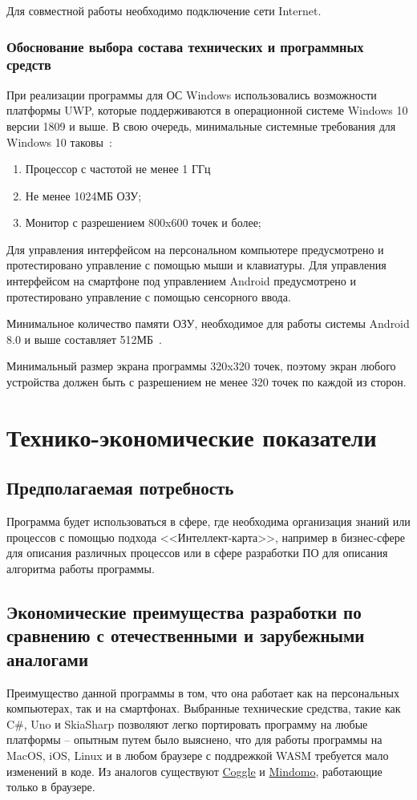 \documentclass[a4paper,12pt]{article}
\begin{document}
    Для совместной работы необходимо подключение сети Internet.

    \subsubsection{Обоснование выбора состава технических и программных средств}
    При реализации программы для ОС Windows использовались возможности платформы UWP, которые поддерживаются в операционной системе Windows 10 версии 1809 и выше. В свою очередь, минимальные системные требования для Windows 10 таковы~\cite{Win10Req}:
    \begin{enumerate}
        \item Процессор с частотой не менее 1 ГГц
        \item Не менее 1024МБ ОЗУ;
        \item Монитор с разрешением 800x600 точек и более;
    \end{enumerate}

    Для управления интерфейсом на персональном компьютере предусмотрено и протестировано управление с помощью мыши и клавиатуры. Для управления интерфейсом на смартфоне под управлением Android предусмотрено и протестировано управление с помощью сенсорного ввода.

    Минимальное количество памяти ОЗУ, необходимое для работы системы Android 8.0 и выше составляет 512МБ~\cite{AndroidReq}.

    Минимальный размер экрана программы 320x320 точек, поэтому экран любого устройства должен быть с разрешением не менее 320 точек по каждой из сторон.

    \newpage


    \section{Технико-экономические показатели}

    \subsection{Предполагаемая потребность}
    Программа будет использоваться в сфере, где необходима организация знаний или процессов с помощью подхода <<Интеллект-карта>>, например в бизнес-сфере для описания различных процессов или в сфере разработки ПО для описания алгоритма работы программы.

    \subsection{Экономические преимущества разработки по сравнению с отечественными и зарубежными аналогами}
    Преимущество данной программы в том, что она работает как на персональных компьютерах, так и на смартфонах. Выбранные технические средства, такие как C#, Uno и SkiaSharp позволяют легко портировать программу на любые платформы -- опытным путем было выяснено, что для работы программы на MacOS, iOS, Linux и в любом браузере с поддрежкой WASM требуется мало изменений в коде.
    Из аналогов существуют \href{http://www.coggle.it}{Coggle} и \href{https://www.mindomo.com/}{Mindomo}, работающие только в браузере.
\end{document}
